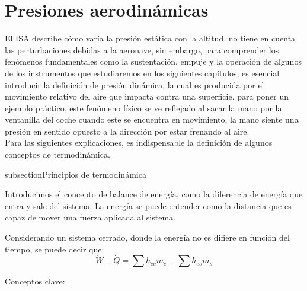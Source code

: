 \section{Presiones aerodinámicas}

El ISA describe cómo varía la presión estática con la altitud, no tiene en cuenta las perturbaciones debidas a la aeronave, sin embargo, para comprender los fenómenos fundamentales como la sustentación, empuje y la operación de algunos de los instrumentos que estudiaremos en los siguientes capítulos, es esencial introducir la definición de presión dinámica, la cual es producida por el movimiento relativo del aire que impacta contra una superficie, para poner un ejemplo práctico, este fenómeno físico se ve reflejado al sacar la mano por la ventanilla del coche cuando este se encuentra en movimiento, la mano siente una presión en sentido opuesto a la dirección por estar frenando al aire.\\

Para las siguientes explicaciones, es indispensable la definición de algunos conceptos de termodinámica. 

subsection{Principios de termodinámica}

Introducimos el concepto de balance de energía, como la diferencia de energía que entra y sale del sistema. La energía se puede entender como la distancia que es capaz de mover una fuerza aplicada al sistema.

\begin{definicion} Considerando un sistema cerrado, donde la energía no es difiere en función del tiempo, se puede decir que:
\begin{equation}
\dot{W} - \dot{Q} =  \sum h_{ec} \dot{m}_{e} - \sum h_{es} \dot{m}_{s}
\label{eq:Balancedeenergia}
\end{equation}
\end{definicion}

Conceptos clave:

